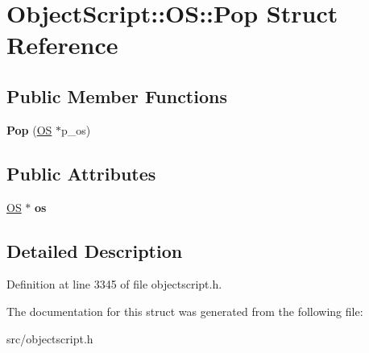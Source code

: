 \hypertarget{struct_object_script_1_1_o_s_1_1_pop}{}\section{Object\+Script\+:\+:OS\+:\+:Pop Struct Reference}
\label{struct_object_script_1_1_o_s_1_1_pop}
\subsection*{Public Member Functions}
\begin{DoxyCompactItemize}
\item 
{\bfseries Pop} (\hyperlink{class_object_script_1_1_o_s}{OS} $\ast$p\+\_\+os)\hypertarget{struct_object_script_1_1_o_s_1_1_pop_a9c5c8d9e227fe188b3d0c65ebd1dc872}{}\label{struct_object_script_1_1_o_s_1_1_pop_a9c5c8d9e227fe188b3d0c65ebd1dc872}

\end{DoxyCompactItemize}
\subsection*{Public Attributes}
\begin{DoxyCompactItemize}
\item 
\hyperlink{class_object_script_1_1_o_s}{OS} $\ast$ {\bfseries os}\hypertarget{struct_object_script_1_1_o_s_1_1_pop_afed3e2b48128cfc8f74fff2ebd7a7edb}{}\label{struct_object_script_1_1_o_s_1_1_pop_afed3e2b48128cfc8f74fff2ebd7a7edb}

\end{DoxyCompactItemize}


\subsection{Detailed Description}


Definition at line 3345 of file objectscript.\+h.



The documentation for this struct was generated from the following file\+:\begin{DoxyCompactItemize}
\item 
src/objectscript.\+h\end{DoxyCompactItemize}
